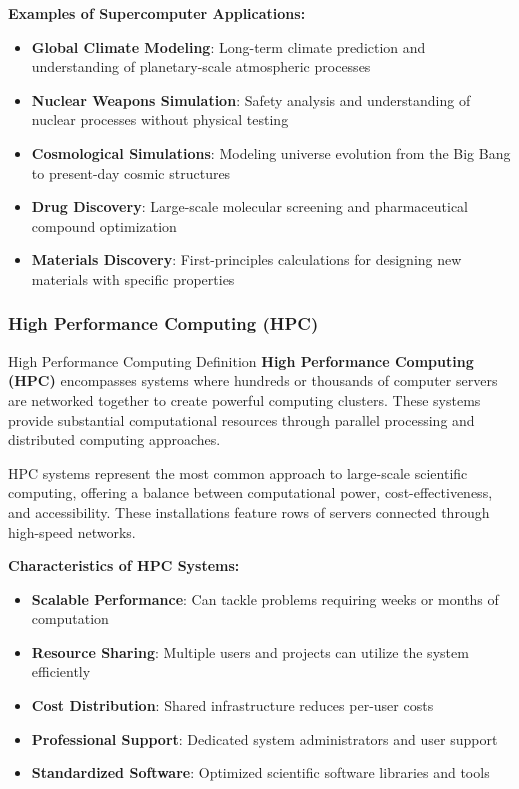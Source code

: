 \textbf{Examples of Supercomputer Applications:}
\begin{itemize}
    \item \textbf{Global Climate Modeling}: Long-term climate prediction and understanding of planetary-scale atmospheric processes
    \item \textbf{Nuclear Weapons Simulation}: Safety analysis and understanding of nuclear processes without physical testing
    \item \textbf{Cosmological Simulations}: Modeling universe evolution from the Big Bang to present-day cosmic structures
    \item \textbf{Drug Discovery}: Large-scale molecular screening and pharmaceutical compound optimization
    \item \textbf{Materials Discovery}: First-principles calculations for designing new materials with specific properties
\end{itemize}

\subsubsection{High Performance Computing (HPC)}

\begin{conceptcard}{High Performance Computing Definition}
\textbf{High Performance Computing (HPC)} encompasses systems where hundreds or thousands of computer servers are networked together to create powerful computing clusters. These systems provide substantial computational resources through parallel processing and distributed computing approaches.
\end{conceptcard}

HPC systems represent the most common approach to large-scale scientific computing, offering a balance between computational power, cost-effectiveness, and accessibility. These installations feature rows of servers connected through high-speed networks.

\textbf{Characteristics of HPC Systems:}
\begin{itemize}
    \item \textbf{Scalable Performance}: Can tackle problems requiring weeks or months of computation
    \item \textbf{Resource Sharing}: Multiple users and projects can utilize the system efficiently
    \item \textbf{Cost Distribution}: Shared infrastructure reduces per-user costs
    \item \textbf{Professional Support}: Dedicated system administrators and user support
    \item \textbf{Standardized Software}: Optimized scientific software libraries and tools
\end{itemize}

